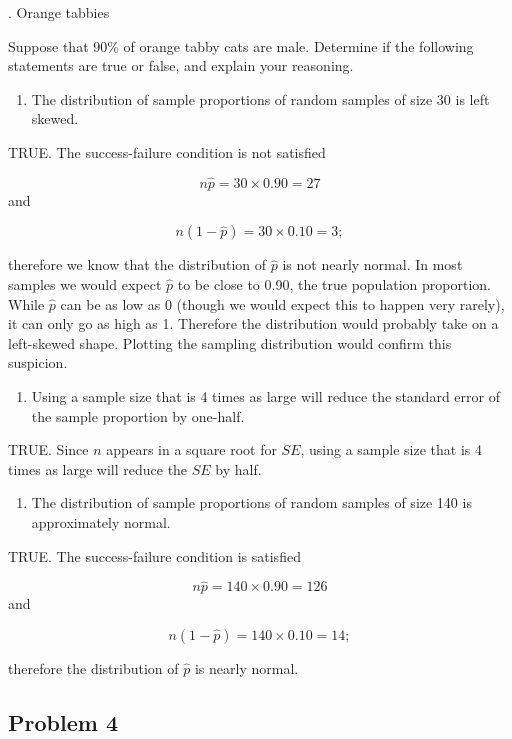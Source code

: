 \documentclass[
]{book}
\providecommand{\tightlist}{%
  \setlength{\itemsep}{0pt}\setlength{\parskip}{0pt}}
\begin{document}
. Orange tabbies

Suppose that 90\% of orange tabby cats are male. Determine if the following statements are true or false, and explain your reasoning.

\begin{enumerate}
\def\labelenumi{\alph{enumi}.}
\tightlist
\item
  The distribution of sample proportions of random samples of size 30 is left skewed.
\end{enumerate}

TRUE. The success-failure condition is not satisfied

\[n\hat{p} = 30 \times 0.90 = 27\] and

\[n(1-\hat{p}) = 30 \times 0.10 = 3;\]

therefore we know that the distribution of \(\hat{p}\) is not nearly normal. In most samples we would expect \(\hat{p}\) to be close to 0.90, the true population proportion. While \(\hat{p}\) can be as low as 0 (though we would expect this to happen very rarely), it can only go as high as 1. Therefore the distribution would probably take on a left-skewed shape. Plotting the sampling distribution would confirm this suspicion.

\begin{enumerate}
\def\labelenumi{\alph{enumi}.}
\setcounter{enumi}{1}
\tightlist
\item
  Using a sample size that is 4 times as large will reduce the standard error of the sample proportion by one-half.
\end{enumerate}

TRUE. Since \(n\) appears in a square root for \(SE\), using a sample size that is 4 times as large will reduce the \(SE\) by half.

\begin{enumerate}
\def\labelenumi{\alph{enumi}.}
\setcounter{enumi}{2}
\tightlist
\item
  The distribution of sample proportions of random samples of size 140 is approximately normal.
\end{enumerate}

TRUE. The success-failure condition is satisfied

\[n\hat{p} = 140 \times 0.90 = 126\] and

\[n(1-\hat{p}) = 140 \times 0.10 = 14;\]

therefore the distribution of \(\hat{p}\) is nearly normal.

\hypertarget{problem-4-10}{%
\subsection{Problem 4}\label{problem-4-10}}
\end{document}
